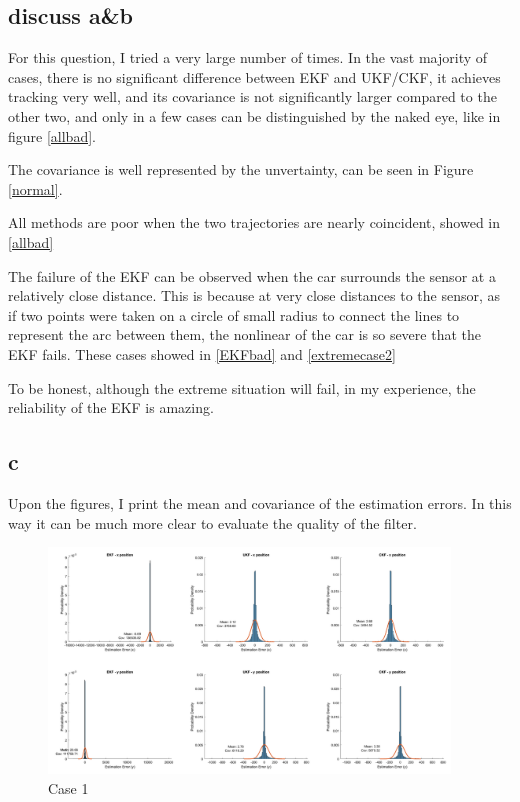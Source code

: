 \subsection{discuss a\&b}

For this question, I tried a very large number of times. In the vast majority of cases, there is no significant difference between EKF and UKF/CKF, it achieves tracking very well, and its covariance is not significantly larger compared to the other two, and only in a few cases can be distinguished by the naked eye, like in figure \ref{allbad}.

The covariance is well represented by the unvertainty, can be seen in Figure \ref{normal}.

All methods are poor when the two trajectories are nearly coincident, showed in \ref{allbad}

The failure of the EKF can be observed when the car surrounds the sensor at a relatively close distance. This is because at very close distances to the sensor, as if two points were taken on a circle of small radius to connect the lines to represent the arc between them, the nonlinear of the car is so severe that the EKF fails. These cases showed in \ref{EKFbad} and \ref{extremecase2}

To be honest, although the extreme situation will fail, in my experience, the reliability of the EKF is amazing.

\subsection{c}

Upon the figures, I print the mean and covariance of the estimation errors. In this way it can be much more clear to evaluate the quality of the filter.

\begin{figure}[H]
 \centering
 \includegraphics[width=0.95\textwidth]{images/hiscase1.png}
 \caption{Case 1}
 \label{c1}
\end{figure}

